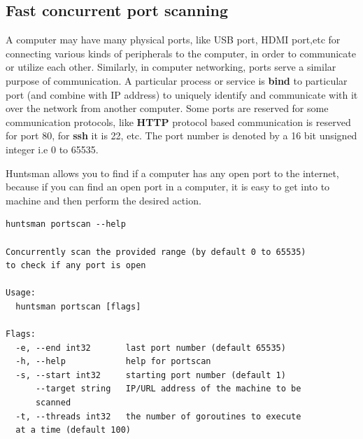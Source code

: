 \documentclass[12pt]{article}
\begin{document}
\subsection{Fast concurrent port scanning}
A computer may have many physical ports, like USB port, HDMI port,etc for connecting various kinds of peripherals to the computer, in order to communicate or utilize each other. Similarly, in computer networking, ports serve a similar purpose of communication. A particular process or service is \textbf{bind} to particular port (and combine with IP address) to uniquely identify and communicate with it over the network from another computer. Some ports are reserved for some communication protocols, like \textbf{HTTP} protocol based communication is reserved for port 80, for \textbf{ssh} it is 22, etc. The port number is denoted by a 16 bit unsigned integer i.e 0 to 65535.

Huntsman allows you to find if a computer has any open port to the internet, because if you can find an open port in a computer, it is easy to get into to machine and then perform the desired action. 
\begin{verbatim}
huntsman portscan --help

Concurrently scan the provided range (by default 0 to 65535) 
to check if any port is open

Usage:
  huntsman portscan [flags]

Flags:
  -e, --end int32       last port number (default 65535)
  -h, --help            help for portscan
  -s, --start int32     starting port number (default 1)
      --target string   IP/URL address of the machine to be 
      scanned
  -t, --threads int32   the number of goroutines to execute 
  at a time (default 100)
\end{verbatim}
\end{document}

